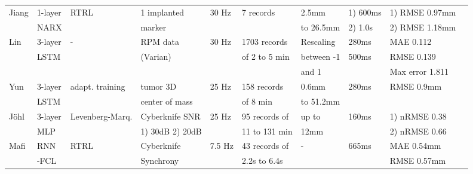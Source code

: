 \documentclass[twocolumn,a4paper]{svjour3} \sloppy          \smartqed
\begin{document}
\begin{table*}[htb]
\begin{center}
\begin{tabular}{llllllllll}
Jiang \cite{jiang2019prediction}& 1-layer & RTRL              & 1 implanted    & 30 Hz   & 7 records       & 2.5mm   & 1) 600ms & 1) RMSE 0.97mm       \\                                                              
                               & NARX    &                   & marker         &         &               & to 26.5mm            & 2) 1.0s  & 2) RMSE 1.18mm      \\
Lin \cite{lin2019towards}      & 3-layer & -                 & RPM data       & 30 Hz    & 1703 records    & Rescaling   & 280ms    & MAE 0.112        \\                                                              
                               & LSTM    &                   & (Varian)       &          & of 2 to 5 min   & between -1  & 500ms    & RMSE 0.139       \\
                               &         &                   &                &          &                 & and 1       &          & Max error 1.811  \\                                                              
Yun \cite{yun2019deep}         & 3-layer & adapt. training   & tumor 3D       & 25 Hz    & 158 records     & 0.6mm       & 280ms    & RMSE 0.9mm       \\                                                              
                               & LSTM    &                   & center of mass &          & of 8 min        & to 51.2mm   &          &                  \\
Jöhl \cite{johl2020performance}& 3-layer & Levenberg-Marq.   & Cyberknife SNR & 25 Hz   & 95 records of      & up to    & 160ms    & 1) nRMSE 0.38       \\                                                              
                               & MLP    &                    & 1) 30dB 2) 20dB &          & 11 to 131 min & 12mm            &          & 2) nRMSE 0.66      \\
Mafi \cite{mafi2020real}       & RNN     & RTRL              & Cyberknife     & 7.5 Hz   & 43 records of   & -           & 665ms    & MAE 0.54mm       \\                                                              
                               & -FCL    &                   & Synchrony      &          & 2.2s to 6.4s    &             &          & RMSE 0.57mm      \\


\end{tabular}
\end{center}
\end{table*}
\end{document}
